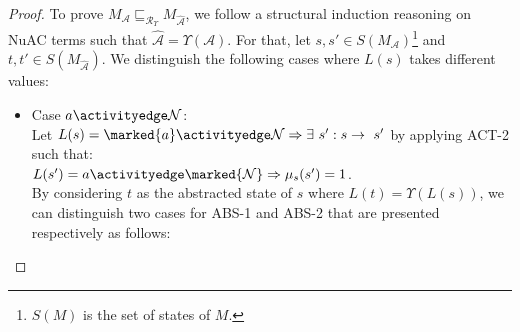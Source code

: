 \begin{proof}
To prove $M_\mathcal{{A}}\sqsubseteq_{\mathscr{R}_\Upsilon}M_\mathcal{{\widehat{A}}}$, we follow a structural induction reasoning on NuAC terms such that $\mathcal{\widehat{A}}=\Upsilon(\mathcal{A})$. For that, let $s,s'\in S(M_{\mathcal{A}})$\footnote{$S(M)$ is the set of states of $M$.} and $t,t'\in S(M_{\mathcal{\widehat{A}}})$. We distinguish the following cases where $L(s)$ takes different values:
\begin{itemize}
  \item Case $a\activityedge\mathcal{N}$:\\
Let $L(s)=\marked{a}\activityedge\mathcal{N}\Rightarrow\exists~s':
s\rightarrow~s'$ by applying ACT-2 such that:\\ $L(s^{\prime})=a\activityedge\marked{\mathcal{N}}\Rightarrow\mu_{s}(s^{\prime})=1$.\\
By considering $t$ as the abstracted state of $s$ where $L(t)=\Upsilon(L(s))$, we can distinguish two cases for ABS-1 and ABS-2 that are presented respectively as follows:
\end{itemize}
\end{proof}
